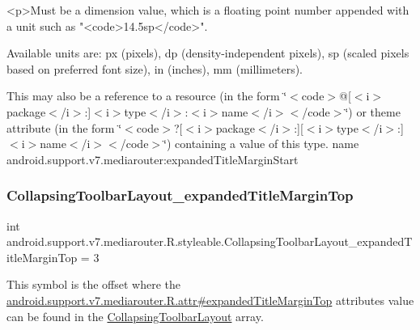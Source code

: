 \begin{DoxyVerb}      <p>Must be a dimension value, which is a floating point number appended with a unit such as "<code>14.5sp</code>".
\end{DoxyVerb}
 Available units are\+: px (pixels), dp (density-\/independent pixels), sp (scaled pixels based on preferred font size), in (inches), mm (millimeters). 

This may also be a reference to a resource (in the form \char`\"{}$<$code$>$@\mbox{[}$<$i$>$package$<$/i$>$\+:\mbox{]}$<$i$>$type$<$/i$>$\+:$<$i$>$name$<$/i$>$$<$/code$>$\char`\"{}) or theme attribute (in the form \char`\"{}$<$code$>$?\mbox{[}$<$i$>$package$<$/i$>$\+:\mbox{]}\mbox{[}$<$i$>$type$<$/i$>$\+:\mbox{]}$<$i$>$name$<$/i$>$$<$/code$>$\char`\"{}) containing a value of this type.  name android.\+support.\+v7.\+mediarouter\+:expanded\+Title\+Margin\+Start \mbox{\label{classandroid_1_1support_1_1v7_1_1mediarouter_1_1R_1_1styleable_ab761558efd3406c65c9f69c800bfca94}} 
\subsubsection{\texorpdfstring{Collapsing\+Toolbar\+Layout\+\_\+expanded\+Title\+Margin\+Top}{CollapsingToolbarLayout\_expandedTitleMarginTop}}
{\footnotesize\ttfamily int android.\+support.\+v7.\+mediarouter.\+R.\+styleable.\+Collapsing\+Toolbar\+Layout\+\_\+expanded\+Title\+Margin\+Top = 3\hspace{0.3cm}{\ttfamily [static]}}

This symbol is the offset where the \hyperlink{classandroid_1_1support_1_1v7_1_1mediarouter_1_1R_1_1attr_a929badf3e20735613d086893ef78582d}{android.\+support.\+v7.\+mediarouter.\+R.\+attr\#expanded\+Title\+Margin\+Top} attribute\textquotesingle{}s value can be found in the \hyperlink{classandroid_1_1support_1_1v7_1_1mediarouter_1_1R_1_1styleable_aae2cb4975e9b9a19d129888f497cc386}{Collapsing\+Toolbar\+Layout} array.

